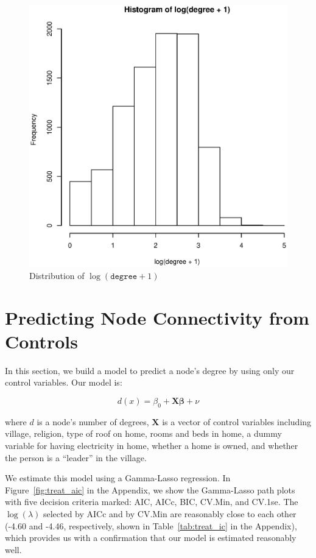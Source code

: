 \documentclass[11pt, fleqn]{article}
\begin{document}
\begin{figure}[!htb]
  \centering
  \includegraphics[scale=.5]{degrees_log.eps}
  \caption{Distribution of $\log(\texttt{degree}+1)$}
  \label{fig:log_degrees}
\end{figure}


\section{Predicting Node Connectivity from Controls}
\label{sec:predict}

In this section, we build a model to predict a node's degree by using only our control variables. Our model is: 

\begin{equation} \label{eq:treat}
d(x) = \beta_0 + \bm{X} \bm{\beta} + \nu
\end{equation}

where $d$ is a node's number of degrees, $\bm{X}$ is a vector of control variables including village, religion, type of roof on home, rooms and beds in home, a dummy variable for having electricity in home, whether a home is owned, and whether the person is a ``leader'' in the village. 

We estimate this model using a Gamma-Lasso regression. In Figure~\ref{fig:treat_aic} in the Appendix, we show the Gamma-Lasso path plots with five decision criteria marked: AIC, AICc, BIC, CV.Min, and CV.1se. The $\log(\lambda)$ selected by AICc and by CV.Min are reasonably close to each other (-4.60 and -4.46, respectively, shown in Table~\ref{tab:treat_ic} in the Appendix), which provides us with a confirmation that our model is estimated reasonably well.
\end{document}
